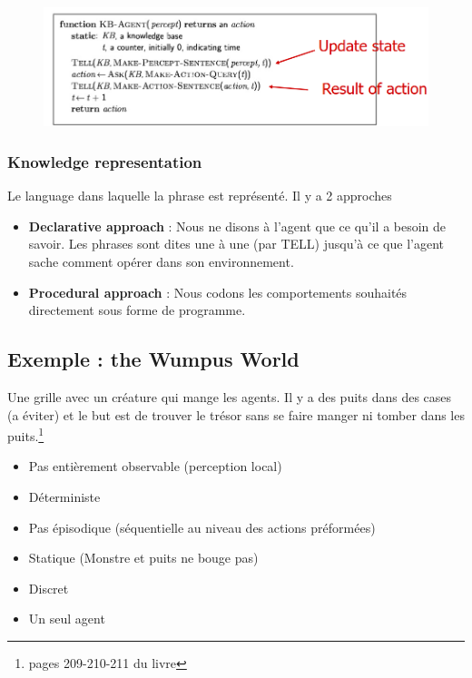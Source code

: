 			\begin{figure}[htp]
				\centering
				\includegraphics[width=\textwidth]{img/KBA1.png}
			\end{figure}
			
		\subsubsection{Knowledge representation}
			Le language dans laquelle la phrase est représenté. Il y a 2 approches
			\begin{itemize}
				\item \textbf{Declarative approach} : Nous ne disons à l'agent que ce qu'il a besoin de savoir. Les phrases sont dites une à une (par TELL) jusqu'à ce que l'agent sache comment opérer dans son environnement.
				\item \textbf{Procedural approach} : Nous codons les comportements souhaités directement sous forme de programme.
			\end{itemize}
			
	\subsection{Exemple : the Wumpus World}
	
		Une grille avec un créature qui mange les agents. Il y a des puits dans des cases (a éviter) et le but est de trouver le trésor sans se faire manger ni tomber dans les puits.\footnote{pages 209-210-211 du livre}
		\begin{itemize}
			\item Pas entièrement observable (perception local)
			\item Déterministe
			\item Pas épisodique (séquentielle au niveau des actions préformées)
			\item Statique (Monstre et puits ne bouge pas)
			\item Discret
			\item Un seul agent
		\end{itemize}
		
